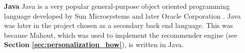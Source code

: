 \noindent\textbf{Java}\newline
Java is a very popular general-purpose object oriented programming language developed by Sun Microsystems and later Oracle Corporation \cite{HM9}. Java was later in the project chosen as a secondary back end language. This was because Mahout, which was used to implement the recommender engine (see \textbf{Section \ref{sec:personalization_how}}), is written in Java. 

\cleardoublepage